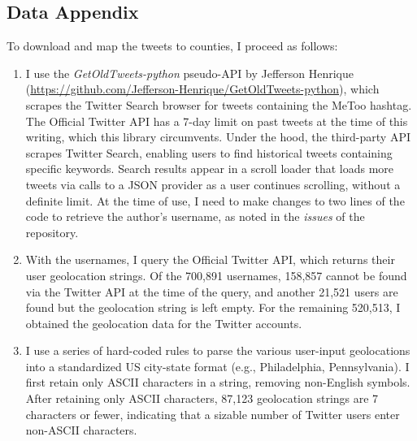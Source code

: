 \documentclass[manuscript,screen,nonacm,11pt,acm]{acmart}
\begin{document}
\begin{bibunit}
\makeatletter
\let\appx@natlinkstart\hyper@natlinkstart
\def\hyper@natlinkstart#1{\appx@natlinkstart{appx.#1}}
\let\appx@natanchorstart\hyper@natanchorstart
\def\hyper@natanchorstart#1{\appx@natanchorstart{appx.#1}}
\makeatother

\section{Data Appendix}
\label{sm:data}
\small
To download and map the tweets to counties, I proceed as follows:
\begin{enumerate}
	\item{I use the \textit{GetOldTweets-python} pseudo-API by Jefferson Henrique (\url{https://github.com/Jefferson-Henrique/GetOldTweets-python}), which scrapes the Twitter Search browser for tweets containing the MeToo hashtag.
	The Official Twitter API has a 7-day limit on past tweets at the time of this writing, which this library circumvents. Under the hood, the third-party API scrapes Twitter Search, enabling users to find historical tweets containing specific keywords. Search results appear in a scroll loader that loads more tweets via calls to a JSON provider as a user continues scrolling, without a definite limit. At the time of use, I need to make changes to two lines of the code to retrieve the author's username, as noted in the \emph{issues} of the repository. }
	
	\item{With the usernames, I query the Official Twitter API, which returns their user geolocation strings. 
		Of the 700,891 usernames, 158,857 cannot be found via the Twitter API at the time of the query, and another 21,521 users are found but the geolocation string is left empty.
		For the remaining 520,513, I obtained the geolocation data for the Twitter accounts.}
	
	\item{I use a series of hard-coded rules to parse the various user-input geolocations into a standardized US city-state format (e.g., Philadelphia, Pennsylvania). I first retain only ASCII characters in a string, removing non-English symbols. After retaining only ASCII characters, 87,123 geolocation strings are 7 characters or fewer, indicating that a sizable number of Twitter users enter non-ASCII characters.}
	

\end{enumerate}
\end{bibunit}
\end{document}
